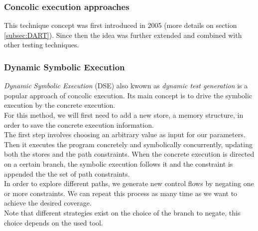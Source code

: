 \documentclass[11pt]{IEEEtran}
\begin{document}
    	\subsubsection*{Concolic execution approaches}
    		This technique concept was first introduced in 2005 \cite{godefroid2005dart} (more details on section \ref{subsec:DART}). %
    	  Since then the idea was further extended and combined with other testing techniques.\\

  		\subsubsection{Dynamic Symbolic Execution}
  		\label{subsec:dynamicSymbolicExec}
  			\emph{Dynamic Symbolic Execution} (DSE) also kwown as \emph{dynamic test generation} \cite{godefroid2005dart} is a popular approach of concolic execution. Its main concept is to drive the symbolic execution by the concrete execution.\\

  			For this method, we will first need to add a new store, a memory structure, in order to save the concrete execution information.\\
  			The first step involves choosing an arbitrary value as input for our parameters. Then it executes the program concretely and symbolically concurrently, updating both the stores and the path constraints. When the concrete execution is directed on a certain branch, the symbolic execution follows it and the constraint is appended the the set of path constraints.\\
  			In order to explore different paths, we generate new control flows by negating one or more constraints. We can repeat this process as many time as we want to achieve the desired coverage.\\

  			Note that different strategies exist on the choice of the branch to negate, this choice depends on the used tool.\\
\end{document}
